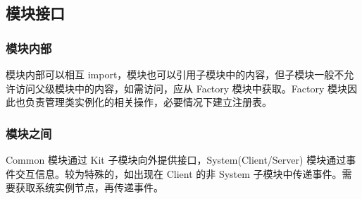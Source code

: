 \subsection{模块接口}
\subsubsection{模块内部}

模块内部可以相互 import，模块也可以引用子模块中的内容，但子模块一般不允许访问父级模块中的内容，如需访问，应从 Factory 模块中获取。Factory 模块因此也负责管理类实例化的相关操作，必要情况下建立注册表。

\subsubsection{模块之间}
Common 模块通过 Kit 子模块向外提供接口，System(Client/Server) 模块通过事件交互信息。较为特殊的，如出现在 Client 的非 System 子模块中传递事件。需要获取系统实例节点，再传递事件。

\newpage